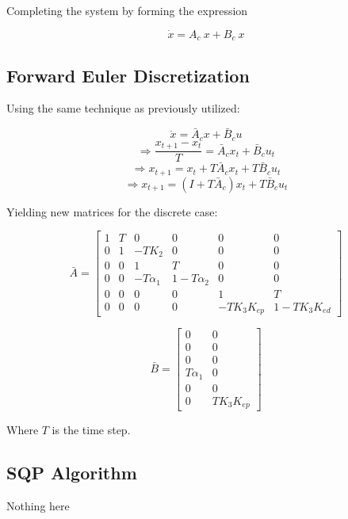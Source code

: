 Completing the system by forming the expression

\begin{equation}
\dot{x} = A_c\ x + B_c\ x
\end{equation}

\subsection{Forward Euler Discretization}

Using the same technique as previously utilized:

$$ \dot{x} = \bar{A}_c x + \bar{B}_c u $$
$$ \Rightarrow \frac{x_{t+1} - x_t}{T} = \bar{A}_c x_t + \bar{B}_c u_t $$
$$ \Rightarrow x_{t+1} = x_t + T\bar{A}_c x_t + T\bar{B}_c u_t $$
$$ \Rightarrow x_{t+1} = (I + T\bar{A}_c) x_t + T\bar{B}_c u_t $$

Yielding new matrices for the discrete case:

\begin{equation}
\bar{A} =
\begin{bmatrix}
    1 & T & 0 & 0 & 0 & 0 \\
    0 & 1 & -TK_2 & 0 & 0 & 0 \\
    0 & 0 & 1 & T & 0 & 0 \\
    0 & 0 & -T\alpha_1 & 1-T\alpha_2 & 0 & 0 \\
    0 & 0 & 0 & 0 & 1 & T \\
    0 & 0 & 0 & 0 & -TK_3K_{ep} & 1-TK_3K_{ed}
\end{bmatrix}
\end{equation}

\begin{equation}
\bar{B} =
\begin{bmatrix}
    0 & 0 \\
    0 & 0 \\
    0 & 0 \\
    T\alpha_1 & 0 \\
    0 & 0 \\
    0 & TK_3K_{ep}
\end{bmatrix}
\end{equation}

Where $T$ is the time step.

\subsection{SQP Algorithm}
Nothing here

